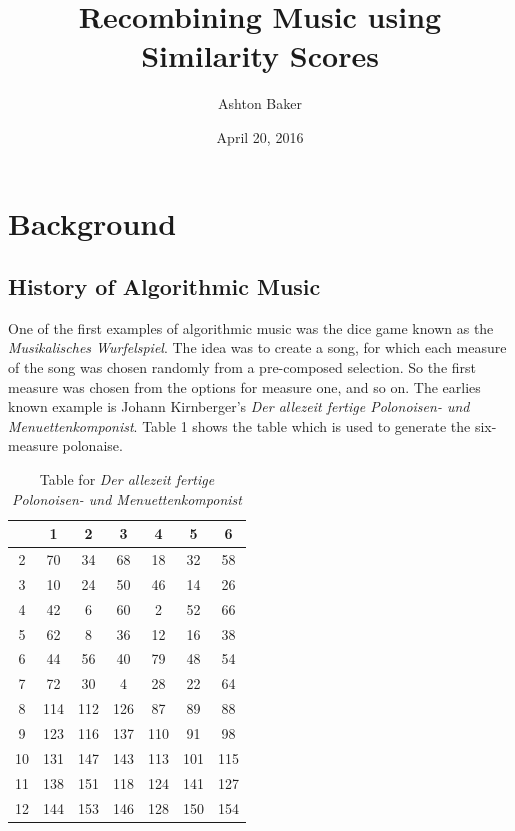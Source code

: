 \documentclass{article}
\title{Recombining Music using Similarity Scores}
\date{April 20, 2016}
\author{Ashton Baker}
\begin{document}
\maketitle

\section{Background}
\subsection{History of Algorithmic Music}
One of the first examples of algorithmic music was the dice game known as the \emph{Musikalisches Wurfelspiel}\cite{cope1996experiments}. The idea was to create a song, for which each measure of the song was chosen randomly from a pre-composed selection. So the first measure was chosen from the options for measure one, and so on. The earlies known example is Johann Kirnberger's \emph{Der allezeit fertige Polonoisen- und Menuettenkomponist}. Table 1 shows the table which is used to generate the six-measure polonaise. 

\begin{table}
\begin{center}
\begin{tabular}{c|c|c|c|c|c|c|}
    &  1 &   2&   3 &   4 &   5 &   6 \\ \hline
 2  & 70 &  34&  68 &  18 &  32 &  58 \\ \hline
 3  & 10 &  24&  50 &  46 &  14 &  26 \\ \hline
 4  & 42 &   6&  60 &   2 &  52 &  66 \\ \hline
 5  & 62 &   8&  36 &  12 &  16 &  38 \\ \hline
 6  & 44 &  56&  40 &  79 &  48 &  54 \\ \hline
 7  & 72 &  30&   4 &  28 &  22 &  64 \\ \hline
 8  &114 & 112& 126 &  87 &  89 &  88 \\ \hline
 9  &123 & 116& 137 & 110 &  91 &  98 \\ \hline
 10 &131 & 147& 143 & 113 & 101 & 115 \\ \hline
 11 &138 & 151& 118 & 124 & 141 & 127 \\ \hline
 12 &144 & 153& 146 & 128 & 150 & 154 \\ \hline
\end{tabular}
\end{center}
\caption{Table for \emph{Der allezeit fertige Polonoisen- und Menuettenkomponist}}
\end{table}
\end{document}
